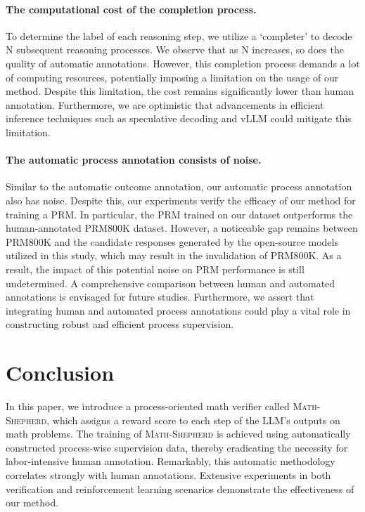 \paragraph{The computational cost of the completion process.} To determine the label of each reasoning step, we utilize a `completer' to decode N subsequent reasoning processes. We observe that as N increases, so does the quality of automatic annotations. However, this completion process demands a lot of computing resources, potentially imposing a limitation on the usage of our method. Despite this limitation, the cost remains significantly lower than human annotation. Furthermore, we are optimistic that advancements in efficient inference techniques such as speculative decoding \citep{xia2022lossless,leviathan2023fast} and vLLM \citep{kwon2023efficient} could mitigate this limitation.

\paragraph{The automatic process annotation consists of noise.} Similar to the automatic outcome annotation,  our automatic process annotation also has noise. Despite this, our experiments verify the efficacy of our method for training a PRM. In particular, the PRM trained on our dataset outperforms the human-annotated PRM800K dataset. However, a noticeable gap remains between PRM800K and the candidate responses generated by the open-source models utilized in this study, which may result in the invalidation of PRM800K. As a result, the impact of this potential noise on PRM performance is still undetermined. A comprehensive comparison between human and automated annotations is envisaged for future studies. Furthermore, we assert that integrating human and automated process annotations could play a vital role in constructing robust and efficient process supervision.

\section{Conclusion}
 In this paper, we introduce a process-oriented math verifier called \textsc{Math-Shepherd}, which assigns a reward score to each step of the LLM's outputs on math problems. The training of \textsc{Math-Shepherd} is achieved using automatically constructed process-wise supervision data, thereby eradicating the necessity for labor-intensive human annotation. Remarkably, this automatic methodology correlates strongly with human annotations. Extensive experiments in both verification and reinforcement learning scenarios demonstrate the effectiveness of our method.


